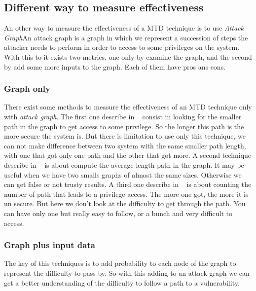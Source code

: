 \subsection{ Different way to measure effectiveness}

An other way to measure the effectiveness of a MTD technique is to use
\emph{Attack Graph}An attack graph is a graph in which we represent a
succession of steps the attacker needs to perform in order to access
to some privileges on the system. With this to it exists two metrics,
one only by examine the graph, and the second by add some more inputs
to the graph. Each of them have pros ans cons.

\subsubsection{ Graph only}

There exist some methods to measure the effectiveness of an MTD
technique only with \emph{attack graph}.\newline
The first one describe in ~\cite{phillips_1998} consist in looking for the
smaller path in the graph to get access to some privilege. So the
longer this path is the more secure the system is. But there is
limitation to use only this technique, we can not make difference
between two system with the same smaller path length, with one that
got only one path and the other that got more. \newline
A second technique describe in ~\cite{li_2006} is about compute the average
length path in the graph. It may be useful when we have two smalls
graphs of almost the same sizes. Otherwise we can get false or not
trusty results. \newline
A third one describe in ~\cite{Ortalo_1999} is about counting the number of
path that leads to a privilege access. The more one got, the more it
is un secure. But here we don't look at the difficulty to get through
the path. You can have only one but really easy to follow, or a bunch
and very difficult to access.

\subsubsection{Graph plus input data}

The key of this techniques is to add probability to each node of the
graph to represent the difficulty to pass by. So with this adding to
an attack graph we can get a better understanding of the difficulty to
follow a path to a vulnerability.

